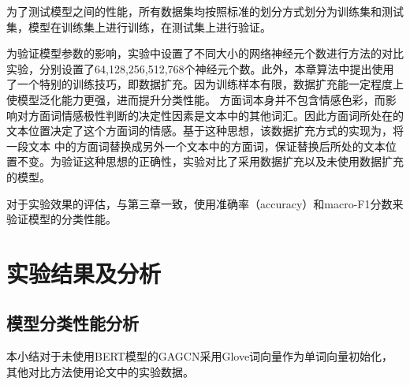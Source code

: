 为了测试模型之间的性能，所有数据集均按照标准的划分方式划分为训练集和测试集，模型在训练集上进行训练，在测试集上进行验证。

为验证模型参数的影响，实验中设置了不同大小的网络神经元个数进行方法的对比实验，分别设置了64,128,256,512,768个神经元个数。此外，本章算法中提出使用了一个特别的训练技巧，即数据扩充。因为训练样本有限，数据扩充能一定程度上使模型泛化能力更强，进而提升分类性能。
方面词本身并不包含情感色彩，而影响对方面词情感极性判断的决定性因素是文本中的其他词汇。因此方面词所处在的文本位置决定了这个方面词的情感。基于这种思想，该数据扩充方式的实现为，将一段文本
中的方面词替换成另外一个文本中的方面词，保证替换后所处的文本位置不变。为验证这种思想的正确性，实验对比了采用数据扩充以及未使用数据扩充的模型。

对于实验效果的评估，与第三章一致，使用准确率（accuracy）和macro-F1分数来验证模型的分类性能。

\section{实验结果及分析}
\subsection{模型分类性能分析}
本小结对于未使用BERT模型的GAGCN采用Glove词向量作为单词向量初始化，其他对比方法使用论文中的实验数据。

